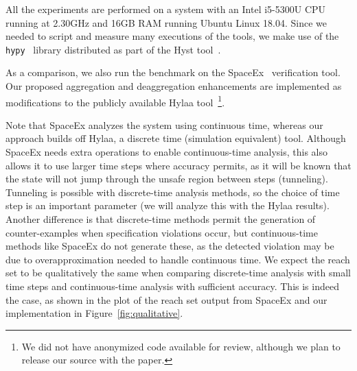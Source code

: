 All the experiments are performed on a system with an Intel i5-5300U CPU running at 2.30GHz and 16GB RAM running Ubuntu Linux 18.04.
%
Since we needed to script and measure many executions of the tools, we make use of the \texttt{hypy}~\cite{hypy} library distributed as part of the
Hyst tool~\cite{bak2015hscc}.

As a comparison, we also run the benchmark on the SpaceEx~\cite{spaceex} verification tool.
%
Our proposed aggregation and deaggregation enhancements are implemented as modifications to the publicly available
Hylaa tool~\cite{bak2017hscc}\footnote{We did not have anonymized code available for review, although we plan to release our source with the paper.}.

Note that SpaceEx analyzes the system using continuous time, whereas our approach builds off Hylaa, a discrete time (simulation equivalent) tool.
%
Although SpaceEx needs extra operations to enable continuous-time analysis, this also allows it to use larger time steps where accuracy permits, as
it will be known that the state will not jump through the unsafe region between steps (tunneling).
%
Tunneling is possible with discrete-time analysis methods, so the choice of time step is an important parameter (we will analyze this with the Hylaa results).
%
Another difference is that discrete-time methods permit the generation of counter-examples when specification violations occur, but continuous-time methods
like SpaceEx do not generate these, as the detected violation may be due to overapproximation needed to handle continuous time.
%
We expect the reach set to be qualitatively the same when comparing discrete-time analysis with small time steps and continuous-time analysis
with sufficient accuracy.
%
This is indeed the case, as shown in the plot of the reach set output from SpaceEx and our implementation in Figure~\ref{fig:qualitative}.

